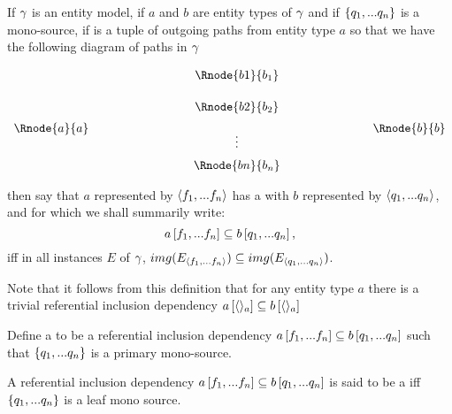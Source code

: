 \begin{definition}
If $\gamma$ is an entity model, 
if $a$ and $b$ are entity types of  $\gamma$ and  if $\left\{q_1,...q_n\right\}$
is a mono-source,
if \fntuple is a tuple of outgoing paths from entity type $a$  
so that we have the following diagram of paths in $\gamma$
\setlength{\arraycolsep}{.2cm}
\begin{center}
$
\begin{array}{cp{2cm}ccp{2cm}c}
             & &         & \Rnode{b1}{b_1} &&               \\ [0.5cm]
						 & &         & \Rnode{b2}{b_2} &&               \\ [0.2cm]
\Rnode{a}{a} & &         &                 &&  \Rnode{b}{b} \\ [-0.2cm]						
             & &         &    \vdots       &&               \\ [0.2cm]
             & &         & \Rnode{bn}{b_n} &&               \\ 
\end{array}
$
\end{center}
then say that $a$ represented by $\langle f_1,...f_n\rangle$ 
has a  with $b$ represented by $\langle q_1,...q_n\rangle$, and for which we shall summarily write:
$$
a\left[f_1,...f_n\right]\subseteq b\left[q_1,...q_n\right],
$$
iff in all instances $E$ of $\gamma$,
$img(E_{\langle f_1,...f_n\rangle}) \subseteq img(E_{\langle q_1,...q_n\rangle})$. 
\end{definition}

Note that it follows from this definition that for any entity type $a$ there is a trivial
referential inclusion dependency $
a\left[\langle\rangle_a\right]\subseteq b\left[\langle\rangle_a\right]$

\begin{definition}
Define a  to be a
referential inclusion dependency $a\left[f_1,...f_n\right]\subseteq b\left[q_1,...q_n\right]$
such that $\left\{q_1,...q_n\right\}$ is a primary mono-source.
\end{definition}

\begin{definition} 
A referential inclusion dependency $a\left[f_1,...f_n\right]\subseteq b\left[q_1,...q_n\right]$ is said to be a  iff $\left\{q_1,...q_n\right\}$ is a leaf mono source.
\end{definition}

